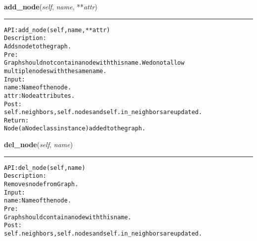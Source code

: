     \label{coinor:gimpy:graph:Graph:add_node}

    \vspace{0.5ex}

\hspace{.8\funcindent}\begin{boxedminipage}{\funcwidth}

    \raggedright \textbf{add\_node}(\textit{self}, \textit{name}, **\textit{attr})

    \vspace{-1.5ex}

    \rule{\textwidth}{0.5\fboxrule}
\setlength{\parskip}{2ex}
\begin{alltt}

API: add\_node(self, name, **attr)
Description:
Adds node to the graph.
Pre:
    Graph should not contain a node with this name. We do not allow
    multiple nodes with the same name.
Input:
    name: Name of the node.
    attr: Node attributes.
Post:
    self.neighbors, self.nodes and self.in\_neighbors are updated.
Return:
    Node (a Node class instance) added to the graph.
\end{alltt}

\setlength{\parskip}{1ex}
    \end{boxedminipage}

    \label{coinor:gimpy:graph:Graph:del_node}

    \vspace{0.5ex}

\hspace{.8\funcindent}\begin{boxedminipage}{\funcwidth}

    \raggedright \textbf{del\_node}(\textit{self}, \textit{name})

    \vspace{-1.5ex}

    \rule{\textwidth}{0.5\fboxrule}
\setlength{\parskip}{2ex}
\begin{alltt}

API: del\_node(self, name)
Description:
Removes node from Graph.
Input:
    name: Name of the node.
Pre:
    Graph should contain a node with this name.
Post:
    self.neighbors, self.nodes and self.in\_neighbors are updated.
\end{alltt}

\setlength{\parskip}{1ex}
    \end{boxedminipage}

